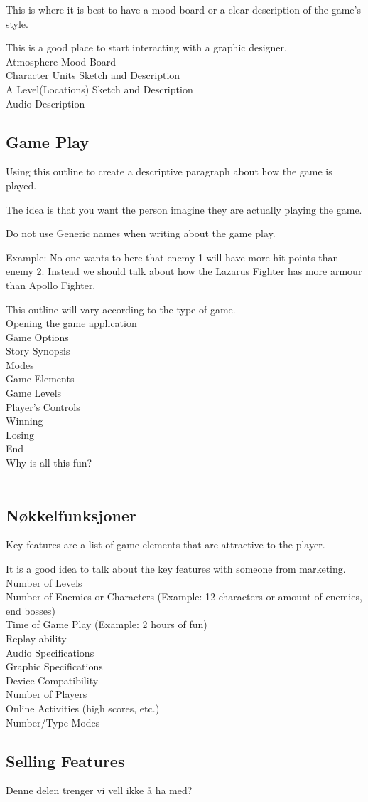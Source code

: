 This is where it is best to have a mood board or a clear description of the game’s style. 

This is a good place to start interacting with a graphic designer.\\

Atmosphere Mood Board\\
Character  Units Sketch and Description\\
A Level(Locations) Sketch and Description\\
Audio Description

\subsection{Game Play}

Using this outline to create a descriptive paragraph about how the game is played. 

The idea is that you want the person imagine they are actually playing the game.

Do not use Generic names when writing about the game play. 

Example: No one wants to here that enemy 1 will have more hit points than enemy 2. Instead we should talk about how the Lazarus Fighter has more armour than Apollo Fighter.

This outline will vary according to the type of game. \\
Opening the game application\\
Game Options \\
Story Synopsis\\
Modes\\
Game Elements\\
Game Levels\\
Player’s Controls\\
Winning\\
Losing\\
End\\
Why is all this fun?\\
\\

\subsection{Nøkkelfunksjoner}

Key features are a list of game elements that are attractive to the player.

It is a good idea to talk about the key features with someone from marketing.\\
Number of Levels\\
Number of Enemies or Characters (Example: 12 characters or amount of enemies, end bosses)\\
Time of Game Play (Example: 2 hours of fun)\\
Replay ability \\
Audio Specifications\\
Graphic Specifications\\
Device Compatibility\\
Number of Players\\
Online Activities (high scores, etc.)\\
Number/Type Modes

\subsection{Selling Features}

Denne delen trenger vi vell ikke å ha med?


